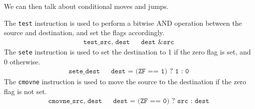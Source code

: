   We can then talk about conditional moves and jumps.  

  \begin{definition}
    \label{def:equality-with-0}
    The \texttt{test} instruction is used to perform a bitwise AND operation between the source and destination, and set the flags accordingly. 
    \begin{align*}
      \texttt{test\_ src, dest} && \texttt{dest \& src} 
    \end{align*}
    The \texttt{sete} instruction is used to set the destination to 1 if the zero flag is set, and 0 otherwise. 
    \begin{align*}
      \texttt{sete\_ dest} && \texttt{dest = (ZF == 1) ? 1 : 0} 
    \end{align*}
    The \texttt{cmovne} instruction is used to move the source to the destination if the zero flag is not set. 
    \begin{align*}
      \texttt{cmovne\_ src, dest} && \texttt{dest = (ZF == 0) ? src : dest} 
    \end{align*}
  \end{definition}


